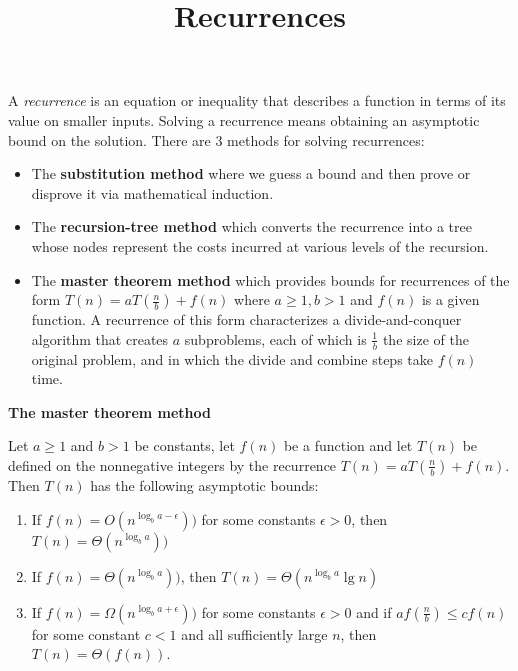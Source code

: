 \documentclass[12pt]{article}
\title{\vspace{-1.0cm}Recurrences}
\date{}
\begin{document}
\maketitle
\vspace{-2.0cm}
A \textit{recurrence} is an equation or inequality that describes a function in terms of its value on smaller inputs. \newline
\hspace*{5mm}Solving a recurrence means obtaining an asymptotic bound on the solution.
There are 3 methods for solving recurrences:
\begin{itemize}
    \item The \textbf{substitution method} where we guess a bound and then prove or disprove it via mathematical induction.
    \item The \textbf{recursion-tree method} which converts the recurrence into a tree whose nodes
          represent the costs incurred at various levels of the recursion.
    \item The \textbf{master theorem method} which provides bounds for recurrences of the form \newline \newline
    $T(n) = a T(\frac{n}{b}) + f(n)$ \newline \newline
          where $a \geq 1, b > 1$ and $f(n)$ is a given function. \newline
          A recurrence of this form characterizes a divide-and-conquer algorithm that creates $a$ subproblems,
          each of which is $\frac{1}{b}$ the size of the original problem, and in which
          the divide and combine steps take $f(n)$ time.
\end{itemize}
\vspace*{10mm}
\begin{large}
    \textbf{The master theorem method}
\end{large} \newline \newline
Let $a \geq 1$ and $b > 1$ be constants, let $f(n)$ be a function and let $T(n)$ be defined on the nonnegative integers
by the recurrence \newline \newline
$T(n) = a T(\frac{n}{b}) + f(n)$. \newline \newline
Then $T(n)$ has the following asymptotic bounds:
\begin{enumerate}
    \item If $f(n) = O(n^{\log_ba - \epsilon}))$ for some constants $\epsilon > 0$, then $T(n) = \Theta(n^{\log_ba}))$
    \item If $f(n) = \Theta(n^{\log_ba}))$, then $T(n) = \Theta(n^{\log_ba}\lg n)$
    \item If $f(n) = \Omega(n^{\log_ba + \epsilon}))$ for some constants $\epsilon > 0$ and if $af(\frac{n}{b}) \leq cf(n)$
          for some constant $c < 1$ and all sufficiently large $n$, then $T(n) = \Theta(f(n))$.
\end{enumerate}
\end{document}
